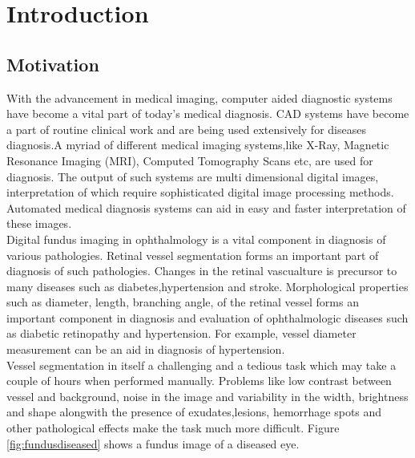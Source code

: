 
\chapter{Introduction}  %

\ifpdf
\graphicspath{{Chapter1/Figs/Raster/}{Chapter1/Figs/PDF/}{Chapter1/Figs/}}
\else
\graphicspath{{Chapter1/Figs/Vector/}{Chapter1/Figs/}}
\fi


\section{Motivation}
With the advancement in medical imaging, computer aided diagnostic systems have become a vital part of today's medical diagnosis\cite{doi2007computer}. CAD systems have become a part of routine clinical work and are being used extensively for diseases diagnosis.A myriad of different medical imaging systems,like X-Ray, Magnetic Resonance Imaging (MRI), Computed Tomography Scans etc, are used for diagnosis. The output of such systems are multi dimensional digital images, interpretation of which require sophisticated digital image processing methods. Automated medical diagnosis systems can aid in easy and faster interpretation of these images.\\	

Digital fundus imaging in ophthalmology is a vital component in diagnosis of various pathologies. Retinal vessel segmentation forms an important part of diagnosis of such pathologies. Changes in the retinal vascualture is precursor to many diseases such as diabetes,hypertension and stroke. Morphological properties such as diameter, length, branching angle, of the retinal vessel forms an important component in diagnosis and evaluation of ophthalmologic diseases such as diabetic retinopathy \cite{sinthanayothin2002automated} and hypertension. For example, vessel diameter measurement can be an aid in diagnosis of hypertension\cite{calvo2011automatic}.\\

Vessel segmentation in itself a challenging and a tedious task which may take a couple of hours when performed manually. Problems like low contrast between vessel and background, noise in the image and variability in the width, brightness and shape alongwith the presence of exudates,lesions, hemorrhage spots and other pathological effects make the task much more difficult. Figure \ref{fig:fundusdiseased} shows a fundus image of a diseased eye.\\

